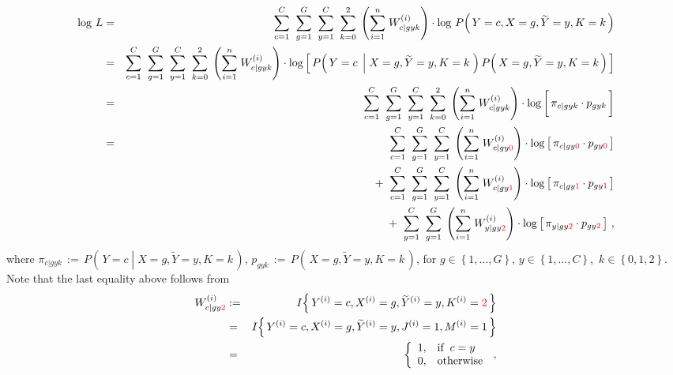\begin{eqnarray*}
\log\,L &=&
	\overset{C}{\underset{c=1}{\sum}}\;\;
	\overset{G}{\underset{g=1}{\sum}}\;\;
	\overset{C}{\underset{y=1}{\sum}}\;\;
	\overset{2}{\underset{k=0}{\sum}}\;
	\left(\overset{n}{\underset{i=1}{\sum}}\;W^{(i)}_{c \vert gyk}\right)
	\cdot
	\log\,P\!\left(\,Y=c,X=g,\widetilde{Y}=y,K=k\,\right)
\\
&=&
	\overset{C}{\underset{c=1}{\sum}}\;\;
	\overset{G}{\underset{g=1}{\sum}}\;\;
	\overset{C}{\underset{y=1}{\sum}}\;\;
	\overset{2}{\underset{k=0}{\sum}}\;
	\left(\overset{n}{\underset{i=1}{\sum}}\;W^{(i)}_{c \vert gyk}\right)
	\cdot
	\log\left[\,
		P\!\left(\,Y=c\;\left\vert\;X=g,\widetilde{Y}=y,K=k\right.\,\right)
		P\!\left(\,X=g,\widetilde{Y}=y,K=k\,\right)
	\,\right]
\\
&=&
	\overset{C}{\underset{c=1}{\sum}}\;\;
	\overset{G}{\underset{g=1}{\sum}}\;\;
	\overset{C}{\underset{y=1}{\sum}}\;\;
	\overset{2}{\underset{k=0}{\sum}}\;
	\left(\overset{n}{\underset{i=1}{\sum}}\;W^{(i)}_{c \vert gyk}\right)
	\cdot
	\log\left[\,
		\pi_{c \vert gyk} \overset{{\color{white}\vert}}{\cdot} p_{gyk}
	\,\right]
\\
&=&
	{\color{white}+} \;\;
	\overset{C}{\underset{c=1}{\sum}}\;\;
	\overset{G}{\underset{g=1}{\sum}}\;\;
	\overset{C}{\underset{y=1}{\sum}}\;
	\left(\overset{n}{\underset{i=1}{\sum}}\;W^{(i)}_{c \vert gy{\color{red}0}}\right)
	\cdot
	\log\left[\,
		\pi_{c \vert gy\color{red}0} \cdot p_{gy\color{red}0}
	\,\right]
\\
&&
	+ \;\;
	\overset{C}{\underset{c=1}{\sum}}\;\;
	\overset{G}{\underset{g=1}{\sum}}\;\;
	\overset{C}{\underset{y=1}{\sum}}\;
	\left(\overset{n}{\underset{i=1}{\sum}}\;W^{(i)}_{c \vert gy{\color{red}1}}\right)
	\cdot
	\log\left[\,
		\pi_{c \vert gy\color{red}1} \cdot p_{gy\color{red}1}
	\,\right]
\\
&&
	+ \;\;
	\overset{C}{\underset{y=1}{\sum}}\;\;
	\overset{G}{\underset{g=1}{\sum}}\;
	\left(\overset{n}{\underset{i=1}{\sum}}\;W^{(i)}_{y \vert gy{\color{red}2}}\right)
	\cdot
	\log\left[\,
		\pi_{y \vert gy\color{red}2} \cdot p_{gy\color{red}2}
	\,\right]\,,
\end{eqnarray*}
where
\;$\pi_{c \vert gyk} \, := \, P\!\left(\,Y=c\;\left\vert\;X=g,\widetilde{Y}=y,K=k\right.\,\right)$,
\;$p_{gyk} \, := \, P\!\left(\,X=g,\widetilde{Y}=y,K=k\,\right)$,
\;for
\;$g \in \left\{1,\ldots,G\right\}$,
\;$y \in \left\{1,\ldots,C\right\}$,
\,$k \in \left\{0,1,2\right\}$.
\;Note that the last equality above follows from
\begin{eqnarray*}
W^{(i)}_{c \vert gy{\color{red}2}}
&:=&
	I\!\left\{\,Y^{(i)}=c,X^{(i)}=g,\widetilde{Y}^{(i)}=y,K^{(i)}={\color{red}2}\,\right\}
\\
&=&
	I\!\left\{\,Y^{(i)}=c,X^{(i)}=g,\widetilde{Y}^{(i)}=y,J^{(i)}=1,M^{(i)}=1\,\right\}
\\
&=&
	\left\{\begin{array}{cl}
		1, & \textnormal{if}\;\; c = y
		\\
		0, & \textnormal{otherwise}
	\end{array}\right.\,,
\end{eqnarray*}
